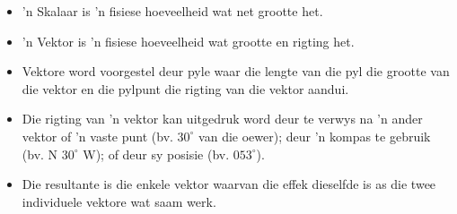 \begin{itemize}
\item  'n Skalaar is  'n fisiese hoeveelheid wat net grootte het.
\item  'n Vektor is  'n fisiese hoeveelheid wat grootte en rigting het.
\item Vektore word voorgestel deur pyle waar die lengte van die pyl die grootte van die vektor en die pylpunt die rigting van die vektor aandui.
\item Die rigting van  'n vektor kan uitgedruk word deur te verwys na  'n ander vektor of  'n vaste punt (bv. $30^{\circ}$ van die oewer); deur  'n kompas te gebruik (bv. N $30^\circ$ W); of deur sy posisie (bv. $053 ^\circ$).
\item Die resultante is die enkele vektor waarvan die effek dieselfde is as die twee individuele vektore wat saam werk. 
\end{itemize}
